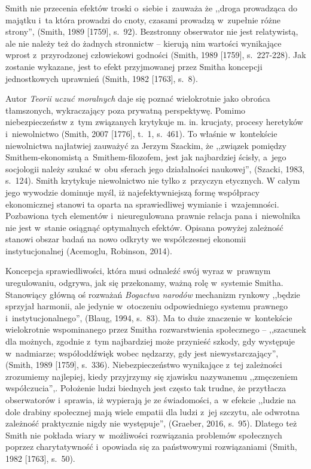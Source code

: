 Smith nie przecenia efektów troski o~siebie i~zauważa że ,,droga prowadząca do majątku i~ta która prowadzi do cnoty, czasami prowadzą w~zupełnie różne strony'', \label{ref:RNDo3EelCAtEP}(Smith, 1989 [1759], s.~92). Bezstronny obserwator nie jest relatywistą, ale nie należy też do żadnych stronnictw -- kierują nim wartości wynikające wprost z~przyrodzonej człowiekowi godności \label{ref:RNDCU5LDHfghn}(Smith, 1989 [1759], s.~227-228). Jak zostanie wykazane, jest to efekt przyjmowanej przez Smitha koncepcji jednostkowych uprawnień \label{ref:RNDBHV5ZarCoy}(Smith, 1982 [1763], s.~8).

Autor \textit{Teorii uczuć moralnych} daje się poznać wielokrotnie jako obrońca tłamszonych, wykraczający poza prywatną perspektywę. Pomimo niebezpieczeństw z~tym związanych krytykuje m. in. krucjaty, procesy heretyków i~niewolnictwo \label{ref:RNDkKZBWJ1Bu0}(Smith, 2007 [1776], t.~1, s.~461). To właśnie w~kontekście niewolnictwa najłatwiej zauważyć za Jerzym Szackim, że ,,związek pomiędzy Smithem-ekonomistą a~Smithem-filozofem, jest jak najbardziej ścisły, a~jego socjologii należy szukać w~obu sferach jego działalności naukowej'', \label{ref:RNDC8VLy7vrzx}(Szacki, 1983, s.~124). Smith krytykuje niewolnictwo nie tylko z~przyczyn etycznych. W całym jego wywodzie dominuje myśl, iż najefektywniejszą formę współpracy ekonomicznej stanowi ta oparta na sprawiedliwej wymianie i~wzajemności. Pozbawiona tych elementów i~nieuregulowana prawnie relacja pana i~niewolnika nie jest w~stanie osiągnąć optymalnych efektów. Opisana powyżej zależność stanowi obszar badań na nowo odkryty we współczesnej ekonomii instytucjonalnej \label{ref:RNDvpwxutjCAN}(Acemoglu, Robinson, 2014).

Koncepcja sprawiedliwości, która musi odnaleźć swój wyraz w~prawnym uregulowaniu, odgrywa, jak się przekonamy, ważną rolę w~systemie Smitha. Stanowiący główną oś rozważań \textit{Bogactwa narodów} mechanizm rynkowy ,,będzie sprzyjał harmonii, ale jedynie w~otoczeniu odpowiedniego systemu prawnego i~instytucjonalnego'', \label{ref:RNDuJ77RGCwoa}(Blaug, 1994, s.~83). Ma to duże znaczenie w~kontekście wielokrotnie wspominanego przez Smitha rozwarstwienia społecznego -- ,,szacunek dla możnych, zgodnie z~tym najbardziej może przynieść szkody, gdy występuje w~nadmiarze; współoddźwięk wobec nędzarzy, gdy jest niewystarczający'', \label{ref:RNDu4UprONNkk}(Smith, 1989 [1759], s.~336). Niebezpieczeństwo wynikające z~tej zależności zrozumiemy najlepiej, kiedy przyjrzymy się zjawisku nazywanemu ,,zmęczeniem współczucia'',. Położenie ludzi biednych jest często tak trudne, że przytłacza obserwatorów i~sprawia, iż wypierają je ze świadomości, a~w efekcie ,,ludzie na dole drabiny społecznej mają wiele empatii dla ludzi z~jej szczytu, ale odwrotna zależność praktycznie nigdy nie występuje'', \label{ref:RNDNWyWu164di}(Graeber, 2016, s.~95). Dlatego też Smith nie pokłada wiary w~możliwości rozwiązania problemów społecznych poprzez charytatywność i~opowiada się za państwowymi rozwiązaniami \label{ref:RNDLkHuKp1To6}(Smith, 1982 [1763], s.~50).

